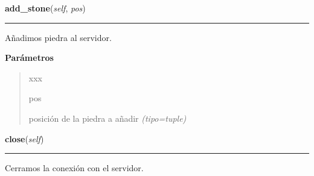     \label{src:igs:Igs:add_stone}

    \vspace{0.5ex}

\hspace{.8\funcindent}\begin{boxedminipage}{\funcwidth}

    \raggedright \textbf{add\_stone}(\textit{self}, \textit{pos})

    \vspace{-1.5ex}

    \rule{\textwidth}{0.5\fboxrule}
\setlength{\parskip}{2ex}
Añadimos piedra al servidor.

\setlength{\parskip}{1ex}
      \textbf{Parámetros}
      \vspace{-1ex}

      \begin{quote}
        \begin{Ventry}{xxx}

          \item[pos]


posición de la piedra a añadir
            {\it (tipo=tuple)}

        \end{Ventry}

      \end{quote}

    \end{boxedminipage}

    \label{src:igs:Igs:close}

    \vspace{0.5ex}

\hspace{.8\funcindent}\begin{boxedminipage}{\funcwidth}

    \raggedright \textbf{close}(\textit{self})

    \vspace{-1.5ex}

    \rule{\textwidth}{0.5\fboxrule}
\setlength{\parskip}{2ex}
Cerramos la conexión con el servidor.

\setlength{\parskip}{1ex}
    \end{boxedminipage}

